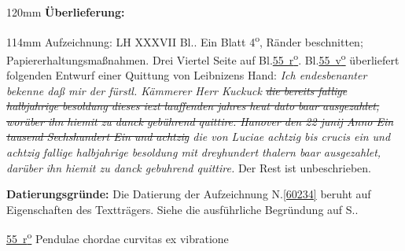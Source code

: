 %
\frenchspacing%
\begin{ledgroupsized}[r]{120mm}%
\footnotesize%
\pstart%
\noindent%
\textbf{Überlieferung:}%
\pend%
\end{ledgroupsized}%
\begin{ledgroupsized}[r]{114mm}%
\footnotesize%
\pstart%
\parindent -6mm%
%
Aufzeichnung:
LH XXXVII Bl..
Ein Blatt 4\textsuperscript{o},
Ränder beschnitten;
Papiererhaltungsmaßnahmen.
Drei Viertel Seite auf Bl.\;\href{\Scan{LH_37_04_055r}}{55~r\textsuperscript{o}}.
Bl.\;\href{\Scan{LH_37_04_055v}}{55~v\textsuperscript{o}} überliefert folgenden Entwurf einer Quittung von Leibnizens Hand:
\textit{%
Ich endesbenanter bekenne
daß mir der fürstl. Kämmerer Herr Kuckuck%
\sout{%
die bereits fallige halbjahrige besoldung dieses iezt lauffenden jahres heut dato baar ausgezahlet,
worüber ihn hiemit zu danck gebührend quittire.
%
Hanover den 22 junij Anno Ein tausend Sechshundert Ein und achtzig%
%
}
die von Luciae achtzig bis crucis ein und achtzig fallige halbjahrige besoldung mit dreyhundert thalern baar ausgezahlet,
darüber ihn hiemit zu danck gebuhrend quittire.%
} %
Der Rest ist unbeschrieben.%
\pend%
\end{ledgroupsized}%
\vspace{5mm}%
\begin{ledgroup}%
\footnotesize%
\pstart%
\noindent%
\textbf{Datierungsgründe:}
Die Datierung der Aufzeichnung N.\;\ref{60234} beruht auf Eigenschaften des Textträgers.
Siehe die ausführliche Begründung auf S.\;\pageref{60234_dat}.%
\pend%
\end{ledgroup}%
%
\frenchspacing%
\vspace{8mm}%
\normalsize%
\pstart%
\noindent%
\lbrack%
\href{\Scan{LH_37_04_055r}}%
{55~r\textsuperscript{o}}%
\rbrack%
\hfill%
Pendulae chordae curvitas ex%
%
%
%
vibratione%
%
%
\hfill%
%
%
\pend%
\vspace{0.5em}%

